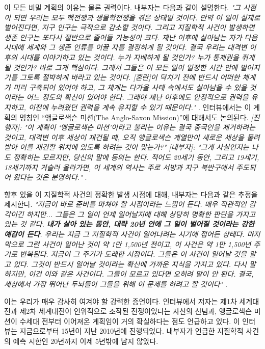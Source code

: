 \documentclass[10pt,twocolumn,letterpaper]{article}
\begin{document}
이 모든 비밀 계획의 이유는 물론 권력이다. 내부자는 다음과 같이 설명한다. \textit{"그 시점이 되면 우리는 모두 핵전쟁과 생물학전쟁을 겪은 상태일 것이다. 만약 이 일이 실제로 벌어진다면, 지구 인구는 극적으로 감소할 것이다. 그리고 지질학적 사건이 발생하면 생존 인구는 또다시 절반으로 줄어들 가능성이 크다. 재난 이후에 살아남는 자가 다음 시대에 세계와 그 생존 인류를 이끌 자를 결정하게 될 것이다. 결국 우리는 대격변 이후의 시대를 이야기하고 있는 것이다. 누가 지배하게 될 것인가? 누가 통제권을 쥐게 될 것인가? 바로 그게 핵심이다. 그래서 그들은 이 모든 일이 일정한 시간 안에 벌어지기를 그토록 절박하게 바라고 있는 것이다. [혼란]이 닥치기 전에 반드시 어떠한 체계가 미리 구축되어 있어야 하고, 그 체계는 다가올 사태 속에서도 살아남을 수 있을 것이라는 어느 정도의 확신이 있어야 한다. 그래야 재난 이후에도 안정적으로 권력을 유지하고, 이전에 누려왔던 권력을 계속 유지할 수 있기 때문이다."} \cite{4}. 인터뷰에서는 이 계획의 명칭인 “앵글로색슨 미션(The Anglo-Saxon Mission)”에 대해서도 논의된다. \textit{[진행자]: "이 계획이 ‘앵글로색슨 미션’이라고 불리는 이유는 결국 중국인을 제거하려는 것이고, 대격변 이후 세상이 재건될 때, 오직 앵글로색슨 계열만이 새로운 세상을 물려받아 이를 재건할 위치에 있도록 하려는 것이 맞는가?" [내부자]: "그게 사실인지는 나도 정확히는 모르지만, 당신의 말에 동의는 한다. 적어도 20세기 동안, 그리고 19세기, 18세기까지 거슬러 올라가면, 이 세계의 역사는 주로 서방과 지구 북반구에서 주도되어 왔다는 것은 분명하다."} \cite{4}.

향후 있을 이 지질학적 사건의 정확한 발생 시점에 대해, 내부자는 다음과 같은 추정을 제시한다. \textit{"지금이 바로 준비를 마쳐야 할 시점이라는 느낌이 든다. 매우 직관적인 감각이긴 하지만... 그들은 그 일이 언제 일어날지에 대해 상당히 명확한 판단을 가지고 있는 것 같다. \textbf{내가 살아 있는 동안, 대략 20년 안에 그 일이 벌어질 것이라는 강한 예감이 든다}. 우리는 지금 그 지질학적 사건이 일어나려는 시기에 접어든 상태다. 마지막으로 그런 사건이 일어난 것이 약 1만 1,500년 전이고, 이 사건은 약 1만 1,500년 주기로 반복된다. 지금이 그 주기가 도래한 시점이다. 그들은 이 사건이 일어날 것을 알고 있다. 그것이 반드시 일어날 것이라는 확신에 가까운 지식을 가지고 있다. 다시 말하지만, 이건 이와 같은 사건이다. 그들이 모르고 있다면 오히려 말이 안 된다. 결국, 세상에서 가장 뛰어난 두뇌들이 그들을 위해 이 문제를 하려고 할 것이다"} \cite{4}.

이는 우리가 매우 감사히 여겨야 할 강력한 증언이다. 인터뷰에서 저자는 제1차 세계대전과 제2차 세계대전이 인위적으로 조작된 전쟁이었다는 자신의 신념과, 앵글로색슨 미션이 수세대 전부터 이어져온 계획임이 거의 확실하다는 점도 언급하고 있다. 이 인터뷰는 지금으로부터 15년이 지난 2010년에 진행되었다. 내부자가 언급한 지질학적 사건의 예측 시한인 20년까지 이제 5년밖에 남지 않았다.
\end{document}
